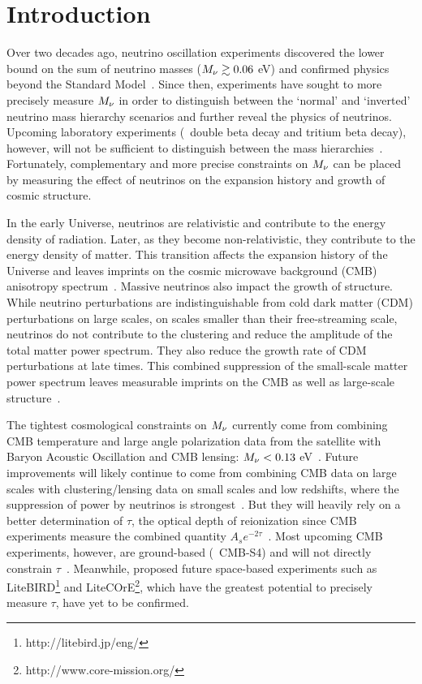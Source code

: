 \section{Introduction} \label{sec:intro}
Over two decades ago, neutrino oscillation experiments discovered the lower
bound on the sum of neutrino masses ($M_\nu \gtrsim 0.06$ eV) and confirmed
physics beyond the Standard Model~\citep{fukuda1998, forero2014, gonzalez-garcia2016}. 
Since then, experiments have sought to more precisely measure $M_\nu$ in order
to distinguish between the `normal' and `inverted' neutrino mass hierarchy
scenarios and further reveal the physics of neutrinos. Upcoming laboratory 
experiments (\eg~double beta decay and tritium beta decay), however, will not
be sufficient to distinguish between the mass hierarchies~\citep{bonn2011, drexlin2013}.
Fortunately, complementary and more precise constraints on $M_\nu$ can be
placed by measuring the effect of neutrinos on the expansion history and growth
of cosmic structure. 

In the early Universe, neutrinos are relativistic and contribute to the 
energy density of radiation. Later, as they become non-relativistic, 
they contribute to the energy density of matter. This transition affects 
the expansion history of the Universe and leaves imprints on the cosmic
microwave background (CMB) anisotropy spectrum~\citep{lesgourgues2012,
lesgourgues2014}. Massive neutrinos also impact the growth of structure. 
While neutrino perturbations are indistinguishable from cold dark matter (CDM)
perturbations on large scales, on scales smaller than their free-streaming
scale, neutrinos do not contribute to the clustering and reduce the 
amplitude of the total matter power spectrum. They also reduce the growth 
rate of CDM perturbations at late times. This combined suppression of 
the small-scale matter power spectrum leaves measurable imprints 
on the CMB as well as large-scale structure~\citep[for further details see][]{lesgourgues2012, lesgourgues2014, gerbino2018}. 

The tightest cosmological constraints on $M_\nu$ currently come from 
combining CMB temperature and large angle polarization data from the 
\planck satellite with Baryon Acoustic Oscillation and CMB lensing: 
$M_\nu < 0.13$ eV~\citep{planckcollaboration2018}. Future improvements
will likely continue to come from combining CMB data on large scales 
with clustering/lensing data on small scales and low redshifts, where 
the suppression of power by neutrinos is strongest~\citep{brinckmann2019}. 
But they will heavily rely on a better determination of $\tau$, the optical
depth of reionization since CMB experiments measure the combined quantity $A_s
e^{-2\tau}$~\citep{allison2015, liu2016, archidiacono2017}.
Most upcoming CMB experiments, however, are ground-based (\eg~CMB-S4) and 
will not directly constrain $\tau$~\citep{abazajian2016}. Meanwhile, proposed
future space-based experiments such as
LiteBIRD\footnote{http://litebird.jp/eng/} and 
LiteCOrE\footnote{http://www.core-mission.org/}, which have the greatest 
potential to precisely measure $\tau$, have yet to be confirmed. 

